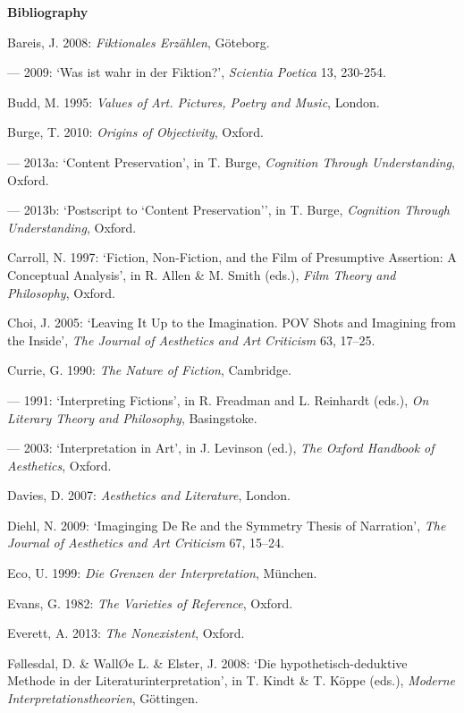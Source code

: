 \vspace{.2cm}
\noindent\textbf{\large Bibliography}
\vspace{.2cm}

\begin{hangparas}{.5cm}{1}

Bareis, J. 2008: \emph{Fiktionales Erz\"ahlen}, G\"oteborg.

--- 2009: `Was ist wahr in der Fiktion?', \emph{Scientia Poetica} 13, 230-254.  

Budd, M. 1995: \emph{Values of Art. Pictures, Poetry and Music}, London. 

Burge, T. 2010: \emph{Origins of Objectivity}, Oxford.

--- 2013a: `Content Preservation', in T. Burge, \emph{Cognition Through Understanding}, Oxford.

--- 2013b: `Postscript to `Content Preservation'', in T. Burge, \emph{Cognition Through Understanding}, Oxford.

Carroll, N. 1997: `Fiction, Non-Fiction, and the Film of Presumptive Assertion: A Conceptual Analysis', in R. Allen \& M. Smith (eds.), \emph{Film Theory and Philosophy}, Oxford.

Choi, J. 2005: `Leaving It Up to the Imagination. POV Shots and Imagining from the Inside', \emph{The Journal of Aesthetics and Art Criticism} 63, 17--25. 

Currie, G. 1990: \emph{The Nature of Fiction}, Cambridge. 

--- 1991: `Interpreting Fictions', in R. Freadman and L. Reinhardt (eds.), \emph{On Literary Theory and Philosophy}, Basingstoke. 

--- 2003: `Interpretation in Art', in J. Levinson (ed.), \emph{The Oxford Handbook of Aesthetics}, Oxford.

Davies, D. 2007: \emph{Aesthetics and Literature}, London.

Diehl, N. 2009: `Imaginging De Re and the Symmetry Thesis of Narration', \emph{The Journal of Aesthetics and Art Criticism} 67, 15--24.

Eco, U. 1999: \emph{Die Grenzen der Interpretation}, M\"unchen. 

Evans, G. 1982: \emph{The Varieties of Reference}, Oxford. 

Everett, A. 2013: \emph{The Nonexistent}, Oxford. 

F\o{}llesdal, D. \& Wall\O{}e L. \& Elster, J. 2008: `Die hypothetisch-deduktive Methode in der Literaturinterpretation', in T. Kindt \& T. K\"oppe (eds.), \emph{Moderne Interpretationstheorien}, G\"ottingen.


\end{hangparas}
